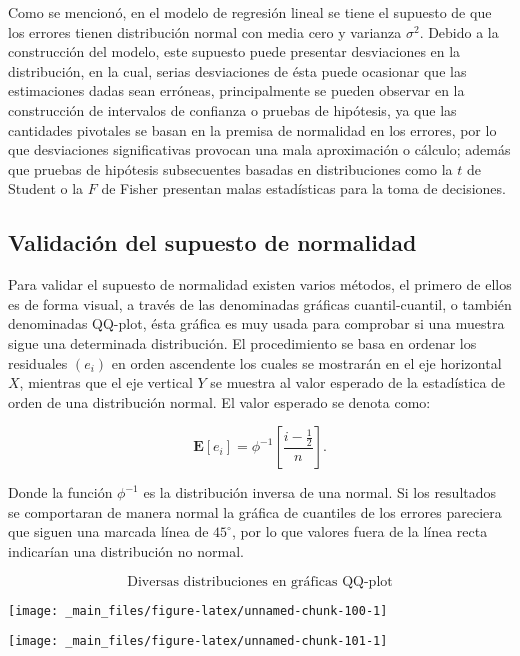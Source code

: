\documentclass[
  a4paper,
  oneside,
  openany]{book}
\begin{document}
Como se mencionó, en el modelo de regresión lineal se tiene el supuesto de que los errores tienen distribución normal con media cero y varianza \(\sigma^2\). Debido a la construcción del modelo, este supuesto puede presentar desviaciones en la distribución, en la cual, serias desviaciones de ésta puede ocasionar que las estimaciones dadas sean erróneas, principalmente se pueden observar en la construcción de intervalos de confianza o pruebas de hipótesis, ya que las cantidades pivotales se basan en la premisa de normalidad en los errores, por lo que desviaciones significativas provocan una mala aproximación o cálculo; además que pruebas de hipótesis subsecuentes basadas en distribuciones como la \(t\) de Student o la \(F\) de Fisher presentan malas estadísticas para la toma de decisiones.

\hypertarget{validaciuxf3n-del-supuesto-de-normalidad}{%
\subsection{Validación del supuesto de normalidad}\label{validaciuxf3n-del-supuesto-de-normalidad}}

Para validar el supuesto de normalidad existen varios métodos, el primero de ellos es de forma visual, a través de las denominadas gráficas cuantil-cuantil, o también denominadas QQ-plot, ésta gráfica es muy usada para comprobar si una muestra sigue una determinada distribución. El procedimiento se basa en ordenar los residuales \((e_{i})\) en orden ascendente los cuales se mostrarán en el eje horizontal \(X\), mientras que el eje vertical \(Y\) se muestra al valor esperado de la estadística de orden de una distribución normal.
El valor esperado se denota como:

\[\mathbf{E}[e_{i}]=\phi^{-1}\left[\frac{i-\frac{1}{2}}{n}\right].\]

Donde la función \(\phi^{-1}\) es la distribución inversa de una normal. Si los resultados se comportaran de manera normal la gráfica de cuantiles de los errores pareciera que siguen una marcada línea de \(45^\circ\), por lo que valores fuera de la línea recta indicarían una distribución no normal.

\[\mbox{Diversas distribuciones en gráficas QQ-plot}\]

\begin{center}\texttt{[image: \_main\_files/figure-latex/unnamed-chunk-100-1]} \end{center}

\begin{center}\texttt{[image: \_main\_files/figure-latex/unnamed-chunk-101-1]} \end{center}
\end{document}
